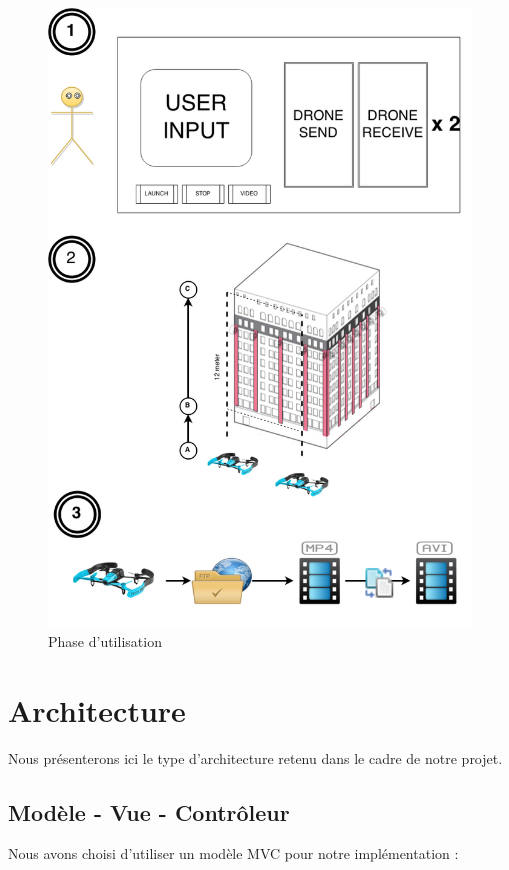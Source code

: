 \documentclass[12pt, openany]{report}
\begin{document}
\begin{figure}[!h]
  \centering
  \includegraphics[width=\textwidth]{figures/osef.png}
  \caption{Phase d'utilisation}
  \label{fig:schema}
\end{figure}

\chapter{Architecture}

Nous présenterons ici le type d'architecture retenu dans le cadre de notre projet. 

\section{Modèle - Vue - Contrôleur}
Nous avons choisi d'utiliser un modèle MVC pour notre implémentation :
\end{document}
